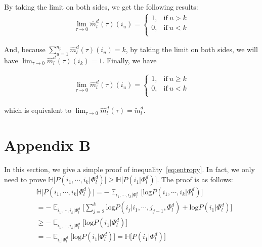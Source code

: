 \documentclass[11pt]{article}
\begin{document}
By taking the limit on both sides, we get the following results:
\begin{align*}
\lim_{\tau \rightarrow 0} \hat{m}_l^d(\tau)(i_u) = \begin{cases}
      1, & \text{if}\ u > k \\
      0, & \text{if}\ u < k \\
    \end{cases}
\end{align*}

And, because $ \displaystyle{\mathop{\sum}_{u=1}^{n_p}}\hat{m}_l^d(\tau)(i_u) = k$, by taking the limit on both sides, we will have $\lim_{\tau \rightarrow 0} \hat{m}_l^d(\tau)(i_k) = 1$. Finally, we have

\begin{align*}
\lim_{\tau \rightarrow 0} \hat{m}_l^d(\tau)(i_u) = \begin{cases}
      1, & \text{if}\ u \geqslant k \\
      0, & \text{if}\ u < k \\
    \end{cases}
\end{align*}

which is equivalent to $\lim_{\tau \rightarrow 0}\hat{m}_l^d(\tau) = \tilde{m}_l^d$.

\section{Appendix B}
\label{appendix:b}
In this section, we give a simple proof of inequality~\eqref{eq:entropy}. In fact, we only need to prove $\mathbb{H} \big[ P(i_1,\cdots,i_k | \Phi_l^d) \big] \geqslant \mathbb{H} \big[ P(i_1 | \Phi_l^d) \big]$. The proof is as follows:
\begin{align*}
&\mathbb{H} \big[ P(i_1,\cdots,i_k | \Phi_l^d) \big] = - \displaystyle{\mathop{\mathbb{E}}_{i_1,\cdots,i_k | \Phi_l^d}} \big[ \text{log}P(i_1,\cdots,i_k | \Phi_l^d) \big] \\
&= -\displaystyle{\mathop{\mathbb{E}}_{i_1,\cdots,i_k | \Phi_l^d}} \big[ \displaystyle{\sum_{j=2}^k}\text{log}P(i_j | i_1,\cdots,j_{j-1},\Phi_l^d) +  \text{log} P(i_1 | \Phi_l^d) \big] \\
&\geqslant -\displaystyle{\mathop{\mathbb{E}}_{i_1,\cdots,i_k | \Phi_l^d}} \big[ \text{log} P(i_1 | \Phi_l^d) \big] \\
&= -\displaystyle{\mathop{\mathbb{E}}_{i_1 | \Phi_l^d}} \big[ \text{log} P(i_1 | \Phi_l^d) \big] = \mathbb{H} \big[ P(i_1 | \Phi_l^d) \big]
\end{align*}
\end{document}
